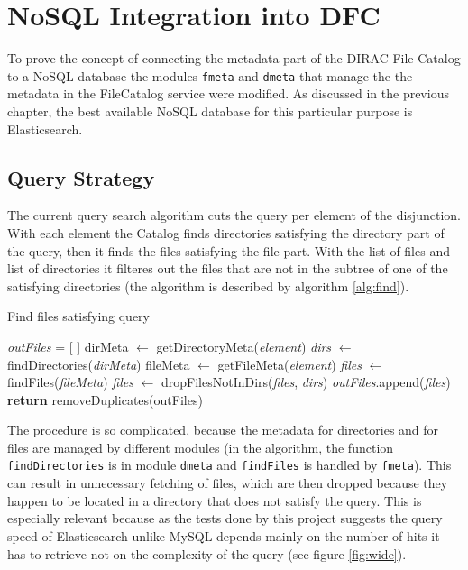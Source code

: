 \chapter{NoSQL Integration into DFC}

To prove the concept of connecting the metadata part of the DIRAC File Catalog to a NoSQL database the 
modules \texttt{fmeta} and \texttt{dmeta} that manage the the metadata in the FileCatalog service were modified.
As discussed in the previous chapter, the best available NoSQL database for this particular purpose is 
Elasticsearch. 

\section{Query Strategy}
The current query search algorithm cuts the query per element of the disjunction. With each element the Catalog
finds directories satisfying the directory part of the query, then it finds the files satisfying the file part. 
With the list of files and list of directories it filteres out the files that are not in the subtree of one of the
satisfying directories (the algorithm is described by algorithm \ref{alg:find}).

\begin{algorithm}[h]
\caption{Find files satisfying query}
\label{alg:find}
\begin{algorithmic}[1]
	\State \textit{outFiles} = [  ]
		\State dirMeta $\leftarrow$ getDirectoryMeta(\textit{element})
		\State \textit{dirs} $\leftarrow$ findDirectories(\textit{dirMeta}) 
		\State fileMeta $\leftarrow$ getFileMeta(\textit{element})
		\State \textit{files} $\leftarrow$ findFiles(\textit{fileMeta})
		\State \textit{files} $\leftarrow$ dropFilesNotInDirs(\textit{files}, \textit{dirs})
		\State \textit{outFiles}.append(\textit{files})
	\EndFor
	\State \textbf{return} removeDuplicates(outFiles)
\EndFunction
\end{algorithmic}
\end{algorithm}

The procedure is so complicated, because the metadata for directories and for files are managed by different 
modules (in the algorithm, the function \texttt{findDirectories} is in module \texttt{dmeta} and \texttt{findFiles} 
is handled by \texttt{fmeta}). This can result in unnecessary fetching of files, which are then dropped because
they happen to be located in a directory that does not satisfy the query. This is especially relevant because as
the tests done by this project suggests the query speed of Elasticsearch unlike MySQL depends mainly on the
number of hits it has to retrieve %
not on the complexity of the query (see figure \ref{fig:wide}). 

